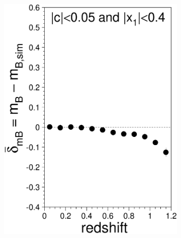 \documentclass[11pt,a4paper]{paper}
\begin{document}
\begin{figure}
    \centering
    \vspace{-20pt}
    \begin{subfigure}[t]{.30\linewidth}
        \centering
        \includegraphics[width=\linewidth]{Answer_figures/Fig_biasCor_mb.eps}
    \end{subfigure}
    \begin{subfigure}[t]{.30\linewidth}
        \centering

\end{subfigure}
\end{figure}
\end{document}

